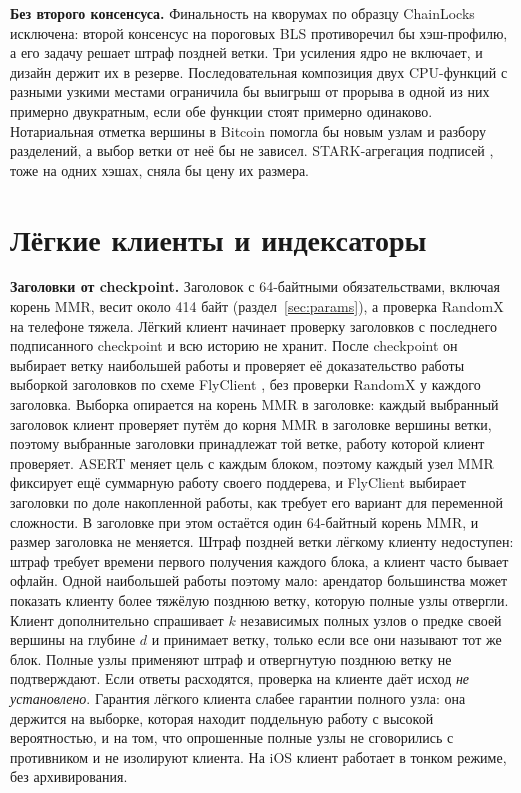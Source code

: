 \documentclass[10pt,a4paper]{article}
\begin{document}
\textbf{Без второго консенсуса.}
Финальность на кворумах по образцу ChainLocks \cite{chainlocks} исключена: второй консенсус на пороговых BLS противоречил бы хэш-профилю, а его задачу решает штраф поздней ветки.
Три усиления ядро не включает, и дизайн держит их в резерве.
Последовательная композиция двух CPU-функций с разными узкими местами ограничила бы выигрыш от прорыва в одной из них примерно двукратным, если обе функции стоят примерно одинаково.
Нотариальная отметка вершины в Bitcoin помогла бы новым узлам и разбору разделений, а выбор ветки от неё бы не зависел.
STARK-агрегация подписей \cite{stark}, тоже на одних хэшах, сняла бы цену их размера.

\section{Лёгкие клиенты и индексаторы}
\label{sec:light}

\textbf{Заголовки от checkpoint.}
Заголовок с 64-байтными обязательствами, включая корень MMR, весит около 414 байт (раздел~\ref{sec:params}), а проверка RandomX на телефоне тяжела.
Лёгкий клиент начинает проверку заголовков с последнего подписанного checkpoint и всю историю не хранит.
После checkpoint он выбирает ветку наибольшей работы и проверяет её доказательство работы выборкой заголовков по схеме FlyClient \cite{flyclient}, без проверки RandomX у каждого заголовка.
Выборка опирается на корень MMR в заголовке: каждый выбранный заголовок клиент проверяет путём до корня MMR в заголовке вершины ветки, поэтому выбранные заголовки принадлежат той ветке, работу которой клиент проверяет.
ASERT меняет цель с каждым блоком, поэтому каждый узел MMR фиксирует ещё суммарную работу своего поддерева, и FlyClient выбирает заголовки по доле накопленной работы, как требует его вариант для переменной сложности.
В заголовке при этом остаётся один 64-байтный корень MMR, и размер заголовка не меняется.
Штраф поздней ветки лёгкому клиенту недоступен: штраф требует времени первого получения каждого блока, а клиент часто бывает офлайн.
Одной наибольшей работы поэтому мало: арендатор большинства может показать клиенту более тяжёлую позднюю ветку, которую полные узлы отвергли.
Клиент дополнительно спрашивает $k$ независимых полных узлов о предке своей вершины на глубине $d$ и принимает ветку, только если все они называют тот же блок.
Полные узлы применяют штраф и отвергнутую позднюю ветку не подтверждают.
Если ответы расходятся, проверка на клиенте даёт исход \emph{не установлено}.
Гарантия лёгкого клиента слабее гарантии полного узла: она держится на выборке, которая находит поддельную работу с высокой вероятностью, и на том, что опрошенные полные узлы не сговорились с противником и не изолируют клиента.
На iOS клиент работает в тонком режиме, без архивирования.
\end{document}
